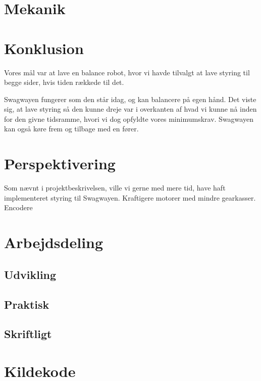 \documentclass[a4paper,oneside,article,danish,table]{memoir}
\begin{document}
\chapter{Mekanik}

\chapter{Konklusion} \label{chap:kon}
Vores mål var at lave en balance robot, hvor vi havde tilvalgt at lave styring til begge sider, hvis tiden rækkede til det.

Swagwayen fungerer som den står idag, og kan balancere på egen hånd. Det viste sig, at lave styring så den kunne dreje var i overkanten af hvad vi kunne nå inden for den givne tidsramme, hvori vi dog opfyldte vores minimumskrav. Swagwayen kan også køre frem og tilbage med en fører.

\chapter{Perspektivering} \label{chap:per}
Som nævnt i projektbeskrivelsen, ville vi gerne med mere tid, have haft implementeret styring til Swagwayen. 
Kraftigere motorer med mindre gearkasser.
Encodere

\clearpage
\listoftables
\listoffigures
\nocite{*}
 
\clearpage \appendix

\chapter{Arbejdsdeling}

\section{Udvikling}
\section{Praktisk}
\section{Skriftligt}

\chapter{Kildekode}
\end{document}
